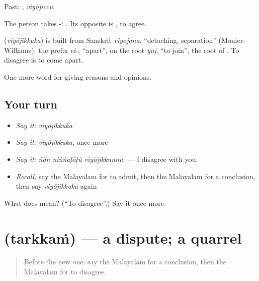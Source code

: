 Past: , \emph{viyōjiccu}.

The person takes -:  . Its opposite is , to agree.

\begin{cousinweb}
\textbf{} (\emph{viyōjikkuka}) is built from Sanskrit \emph{viyojana}, \textquotedblleft{}detaching, separation\textquotedblright{} (Monier-Williams): the prefix \emph{vi-}, \textquotedblleft{}apart\textquotedblright{}, on the root \emph{yuj}, \textquotedblleft{}to join\textquotedblright{}, the root of . To disagree is to come apart.
\end{cousinweb}

\begin{grammarlens}[title={What you've built}]
One more word for giving reasons and opinions.
\end{grammarlens}

\subsection*{Your turn}
\begin{itemize}
\raggedright
  \item \emph{Say it:} \emph{viyōjikkuka}
  \item \emph{Say it:} \emph{viyōjikkuka}, once more
  \item \emph{Say it:} \emph{ñān niṅṅaḷōṭŭ viyōjikkunnu.} — I disagree with you.
  \item \emph{Recall:} say the Malayalam for to admit, then the Malayalam for a conclusion, then say \emph{viyōjikkuka} again
\end{itemize}

\begin{tcolorbox}[breakable,colback=teal!4,colframe=teal!35!black,title={Before you move on}]
What does  mean? (\textquotedblleft{}To disagree\textquotedblright{}.) Say it once more.
\end{tcolorbox}
\section[\texorpdfstring{\ml{തർക്കം} (tarkkaṁ)}{തർക്കം (tarkkaṁ)}]{ (tarkkaṁ) — a dispute; a quarrel}

\label{lesson:ML-C406-tarkkam}



\begin{quote}
Before the new one: say the Malayalam for a conclusion, then the Malayalam for to disagree.
\end{quote}

